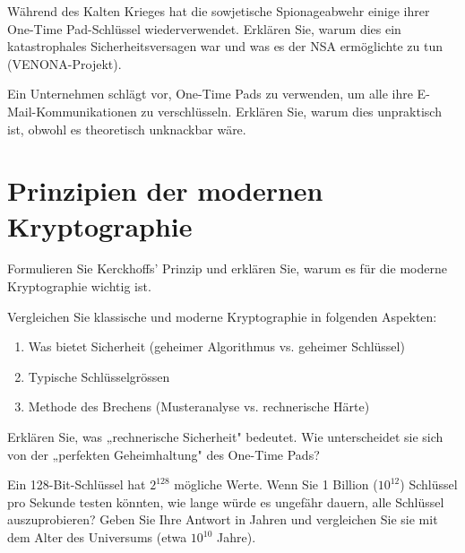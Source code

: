 \documentclass[11pt,a4paper]{report}
\begin{document}
\begin{ex}
Während des Kalten Krieges hat die sowjetische Spionageabwehr einige ihrer One-Time Pad-Schlüssel wiederverwendet. Erklären Sie, warum dies ein katastrophales Sicherheitsversagen war und was es der NSA ermöglichte zu tun (VENONA-Projekt).
\end{ex}

\begin{ex}
Ein Unternehmen schlägt vor, One-Time Pads zu verwenden, um alle ihre E-Mail-Kommunikationen zu verschlüsseln. Erklären Sie, warum dies unpraktisch ist, obwohl es theoretisch unknackbar wäre.
\end{ex}

\section{Prinzipien der modernen Kryptographie}

\begin{ex}
Formulieren Sie Kerckhoffs' Prinzip und erklären Sie, warum es für die moderne Kryptographie wichtig ist.
\end{ex}

\begin{ex}
Vergleichen Sie klassische und moderne Kryptographie in folgenden Aspekten:
\begin{enumerate}[label=\alph*)]
    \item Was bietet Sicherheit (geheimer Algorithmus vs. geheimer Schlüssel)
    \item Typische Schlüsselgrössen
    \item Methode des Brechens (Musteranalyse vs. rechnerische Härte)
\end{enumerate}
\end{ex}

\begin{ex}
Erklären Sie, was „rechnerische Sicherheit" bedeutet. Wie unterscheidet sie sich von der „perfekten Geheimhaltung" des One-Time Pads?
\end{ex}

\begin{ex}
Ein 128-Bit-Schlüssel hat $2^{128}$ mögliche Werte. Wenn Sie 1 Billion ($10^{12}$) Schlüssel pro Sekunde testen könnten, wie lange würde es ungefähr dauern, alle Schlüssel auszuprobieren? Geben Sie Ihre Antwort in Jahren und vergleichen Sie sie mit dem Alter des Universums (etwa $10^{10}$ Jahre).
\end{ex}
\end{document}
